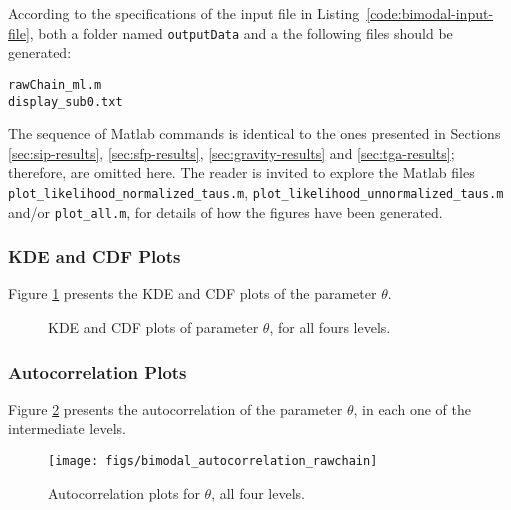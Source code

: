 According to the specifications of the input file in Listing~\ref{code:bimodal-input-file}, both a folder named \verb+outputData+ and a the following files should be generated:
\begin{verbatim}
rawChain_ml.m
display_sub0.txt
\end{verbatim}


The sequence of Matlab commands is identical to the ones presented in Sections
\ref{sec:sip-results}, \ref{sec:sfp-results}, \ref{sec:gravity-results} and \ref{sec:tga-results};
therefore, are omitted here. The reader is invited to explore the Matlab files
\texttt{plot\_likelihood\_normalized\_taus.m},
\texttt{plot\_likelihood\_unnormalized\_taus.m} and/or \texttt{plot\_all.m},  for details of how the figures have been generated.



\subsubsection{KDE and CDF Plots}

Figure \ref{fig:bimodal_kde} presents the KDE and CDF plots of the parameter $\theta$.



\begin{figure}[hptb]
\centering
{}
\vspace{-8pt}
\caption{KDE and CDF plots of parameter $\theta$, for all fours levels.}
\label{fig:bimodal_kde}
\end{figure}

\subsubsection{Autocorrelation Plots}

Figure \ref{fig:bimodal_autocorr} presents the autocorrelation of the parameter $\theta$, in each one of the intermediate levels.

\begin{figure}[htpb]
\centering
\texttt{[image: figs/bimodal\_autocorrelation\_rawchain]}
\vspace{-10pt}
\caption{Autocorrelation plots for $\theta$, all four levels.}
\label{fig:bimodal_autocorr}
\end{figure}



